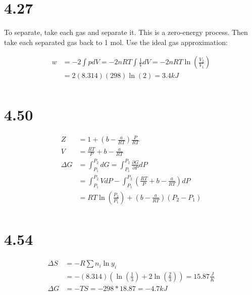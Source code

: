 \documentclass[10pt]{article} %
\begin{document}
\section{4.27}
To separate, take each gas and separate it. This is a zero-energy process. Then take each separated gas back to 1 mol. Use the ideal gas approximation:

\begin{align*}
  w &= -2\int pdV = -2nRT \int \frac{1}{V}dV = -2nRT\ln\left(\frac{V_2}{V_1}\right)\\
  &= 2(8.314)(298)\ln(2) = 3.4kJ\\
\end{align*}

\section{4.50}
\begin{align*}
  Z &= 1 + \left(b - \frac{a}{RT}\right)\frac{P}{RT}\\
  V &= \frac{RT}{P} + b - \frac{a}{RT}\\
  \Delta G &= \int_{P_1}^{P_2} dG = \int_{P_1}^{P_2} \frac{\partial G}{\partial P} dP\\
  &= \int_{P_1}^{P_2} VdP - \int_{P_1}^{P_2} \left(\frac{RT}{P} + b - \frac{a}{RT}\right) dP\\
  &= RT\ln\left(\frac{P_2}{P_1}\right) + \left(b-\frac{a}{RT}\right)\left(P_2-P_1\right)\\
\end{align*}

\section{4.54}
\begin{align*}
  \Delta S &= -R\sum n_i\ln y_i\\
  &= -\left(8.314\right)\left(\ln\left(\frac{1}{3}\right) + 2\ln\left(\frac{2}{3}\right)\right) = 15.87 \frac{J}{K}\\
  \Delta G &= -TS = -298*18.87 = -4.7kJ\\
\end{align*}
\end{document}
